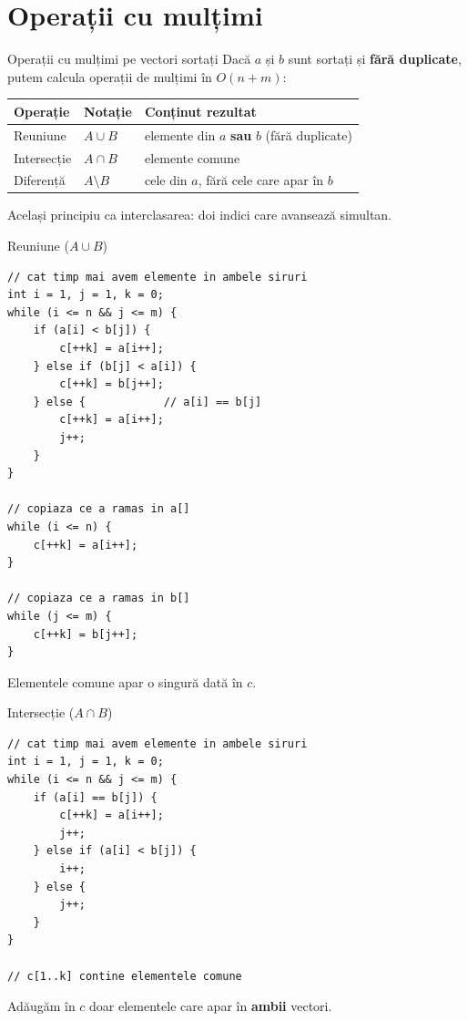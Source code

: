 \documentclass{beamer}
\begin{document}
\section{Operații cu mulțimi}

\begin{frame}{Operații cu mulțimi pe vectori sortați}
  Dacă $a$ și $b$ sunt sortați și \textbf{fără duplicate}, putem calcula operații de mulțimi în $O(n+m)$:

  \begin{center}
  \begin{tabular}{lll}
    \toprule
    Operație & Notație & Conținut rezultat \\
    \midrule
    Reuniune    & $A \cup B$ & elemente din $a$ \textbf{sau} $b$ (fără duplicate) \\
    Intersecție & $A \cap B$ & elemente comune \\
    Diferență   & $A \setminus B$ & cele din $a$, fără cele care apar în $b$ \\
    \bottomrule
  \end{tabular}
  \end{center}

  \smallskip
  Același principiu ca interclasarea: doi indici care avansează simultan.
\end{frame}

\begin{frame}{Reuniune ($A \cup B$)}
  \begin{lstlisting}
// cat timp mai avem elemente in ambele siruri
int i = 1, j = 1, k = 0;
while (i <= n && j <= m) {
    if (a[i] < b[j]) {
        c[++k] = a[i++];
    } else if (b[j] < a[i]) {
        c[++k] = b[j++];
    } else {            // a[i] == b[j]
        c[++k] = a[i++];
        j++;
    }
}

// copiaza ce a ramas in a[]
while (i <= n) {
    c[++k] = a[i++];
}

// copiaza ce a ramas in b[]
while (j <= m) {
    c[++k] = b[j++];
}
  \end{lstlisting}
  Elementele comune apar o singură dată în $c$.
\end{frame}

\begin{frame}[fragile]{Intersecție ($A \cap B$)}
  \begin{lstlisting}
// cat timp mai avem elemente in ambele siruri
int i = 1, j = 1, k = 0;
while (i <= n && j <= m) {
    if (a[i] == b[j]) {
        c[++k] = a[i++];
        j++;
    } else if (a[i] < b[j]) {
        i++;
    } else {
        j++;
    }
}

// c[1..k] contine elementele comune
  \end{lstlisting}
  Adăugăm în $c$ doar elementele care apar în \textbf{ambii} vectori.
\end{frame}
\end{document}
